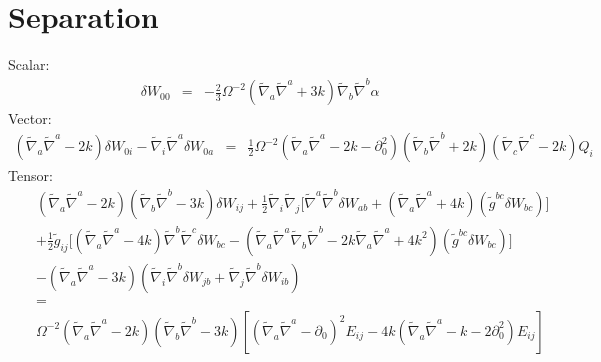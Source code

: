 \documentclass[10pt,letterpaper]{article}
\numberwithin{equation}{section}
\begin{document}
\section{Separation}
%
%
Scalar:
\begin{eqnarray}
\delta W_{00}&=& - \tfrac{2}{3} \Omega^{-2} (\tilde\nabla_a\tilde\nabla^a + 3k)\tilde\nabla_b\tilde\nabla^b \alpha
\end{eqnarray}
Vector:
\begin{eqnarray}
(\tilde\nabla_a\tilde\nabla^a-2k)\delta W_{0i} - \tilde\nabla_i \tilde\nabla^a \delta W_{0a} &=&
\tfrac12 \Omega^{-2} (\tilde\nabla_a\tilde\nabla^a - 2k - \partial_0^2)(\tilde\nabla_b\tilde\nabla^b + 2k)(\tilde\nabla_c\tilde\nabla^c -2k)Q_i
\end{eqnarray}
Tensor:
\begin{eqnarray}
&&(\tilde\nabla_a\tilde\nabla^a-2k)(\tilde\nabla_b\tilde\nabla^b-3k)\delta W_{ij}
+ \tfrac12 \tilde\nabla_i\tilde\nabla_j\big[ \tilde\nabla^a\tilde\nabla^b \delta W_{ab} + (\tilde\nabla_a\tilde\nabla^a +4k)(\tilde g^{bc}\delta W_{bc})\big]
\nonumber\\
&&
+\tfrac12 \tilde g_{ij} \big[ (\tilde\nabla_a\tilde\nabla^a-4k)\tilde\nabla^b\tilde\nabla^c \delta W_{bc}-(\tilde\nabla_a\tilde\nabla^a\tilde\nabla_b\tilde\nabla^b -2k \tilde\nabla_a\tilde\nabla^a +4k^2)(\tilde g^{bc}\delta W_{bc})\big]
\nonumber\\
&&
-(\tilde\nabla_a\tilde\nabla^a -3k)(\tilde\nabla_i\tilde\nabla^b \delta W_{jb} + \tilde\nabla_j \tilde\nabla^b \delta W_{ib})
\nonumber\\
&&=
\nonumber\\
&&\Omega^{-2}(\tilde\nabla_a\tilde\nabla^a-2k)(\tilde\nabla_b\tilde\nabla^b-3k)\left[ (\tilde\nabla_a\tilde\nabla^a-\partial_0)^2 E_{ij} - 4k (\tilde\nabla_a\tilde\nabla^a - k-2\partial_0^2)E_{ij} \right]
\end{eqnarray}
\end{document}
